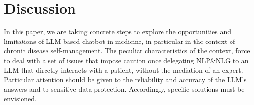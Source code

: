 \documentclass[preprint,12pt]{elsarticle}
\begin{document}







\section{Discussion}\label{sec:conc}

In this paper, we are taking concrete steps to explore the opportunities and limitations of LLM-based chatbot in medicine, 
in particular in the context of chronic disease self-management.
%
The peculiar characteristics of the context, force to deal with a set of issues that impose caution once delegating NLP\&NLG to an LLM that directly interacts with a patient, without the mediation of an expert. 
%
Particular attention should be given to the reliability and accuracy of the LLM's answers and to sensitive data protection.
%
Accordingly, specific solutions must be envisioned.
\end{document}

